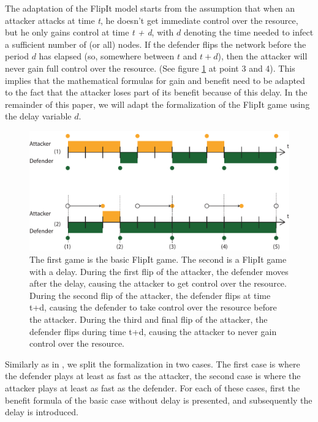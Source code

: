 The adaptation of the FlipIt model starts from the assumption that when an attacker attacks at time \textit{t}, he doesn't get immediate control over the resource, but he only gains control at time \textit{t + d}, with $d$ denoting the time needed to infect a sufficient number of (or all) nodes. If the defender flips the network before the period $d$ has elapsed (so, somewhere between $t$ and $t + d$), then the attacker will never gain full control over the resource. (See figure \ref{dt} at point 3 and 4). This implies that the mathematical formulas for gain and benefit need to be adapted to the fact that the attacker loses part of its benefit because of this delay. In the remainder of this paper, we will adapt the formalization of the FlipIt game using the delay variable $d$. \\ 

\begin{figure}[hbtp]
\centering
\includegraphics[scale=0.7]{Images/Delayuitgelegd.pdf}
\caption{The first game is the basic FlipIt game. The second is a FlipIt game with a delay. During the first flip of the attacker, the defender moves after the delay, causing the attacker to get control over the resource. During the second flip of the attacker, the defender flips at time t+d, causing the defender to take control over the resource before the attacker. During the third and final flip of the attacker, the defender flips during time t+d, causing the attacker to never gain control over the resource. }
\label{dt}
\end{figure}

Similarly as in \cite{FlipIt}, we split the formalization in two cases. The first case is where the defender plays at least as fast as the attacker, the second case is where the attacker plays at least as fast as the defender. For each of these cases, first the benefit formula of the basic case without delay is presented, and subsequently the delay is introduced.  \\

